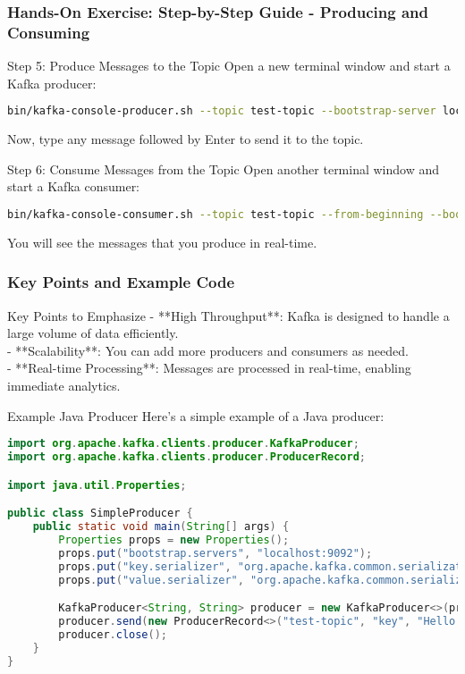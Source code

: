 \documentclass[aspectratio=169]{beamer}
\begin{document}
\begin{frame}[fragile]
    \frametitle{Hands-On Exercise: Step-by-Step Guide - Producing and Consuming}
    \begin{block}{Step 5: Produce Messages to the Topic}
        Open a new terminal window and start a Kafka producer:

        \begin{lstlisting}[language=bash]
bin/kafka-console-producer.sh --topic test-topic --bootstrap-server localhost:9092
        \end{lstlisting}
        Now, type any message followed by Enter to send it to the topic.
    \end{block}

    \begin{block}{Step 6: Consume Messages from the Topic}
        Open another terminal window and start a Kafka consumer:

        \begin{lstlisting}[language=bash]
bin/kafka-console-consumer.sh --topic test-topic --from-beginning --bootstrap-server localhost:9092
        \end{lstlisting}
        You will see the messages that you produce in real-time.
    \end{block}
\end{frame}

\begin{frame}[fragile]
    \frametitle{Key Points and Example Code}
    \begin{block}{Key Points to Emphasize}
        - **High Throughput**: Kafka is designed to handle a large volume of data efficiently. \\
        - **Scalability**: You can add more producers and consumers as needed. \\
        - **Real-time Processing**: Messages are processed in real-time, enabling immediate analytics.
    \end{block}

    \begin{block}{Example Java Producer}
        Here's a simple example of a Java producer:

        \begin{lstlisting}[language=Java]
import org.apache.kafka.clients.producer.KafkaProducer;
import org.apache.kafka.clients.producer.ProducerRecord;

import java.util.Properties;

public class SimpleProducer {
    public static void main(String[] args) {
        Properties props = new Properties();
        props.put("bootstrap.servers", "localhost:9092");
        props.put("key.serializer", "org.apache.kafka.common.serialization.StringSerializer");
        props.put("value.serializer", "org.apache.kafka.common.serialization.StringSerializer");

        KafkaProducer<String, String> producer = new KafkaProducer<>(props);
        producer.send(new ProducerRecord<>("test-topic", "key", "Hello Kafka!"));
        producer.close();
    }
}
        \end{lstlisting}
    \end{block}
\end{frame}
\end{document}
